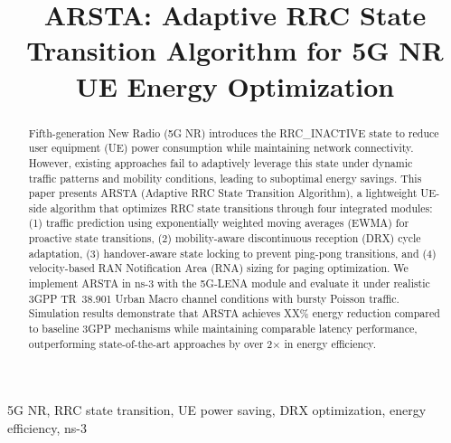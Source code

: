 \documentclass[conference]{IEEEtran}
\begin{document}
\title{ARSTA: Adaptive RRC State Transition Algorithm for 5G NR UE Energy Optimization}

\author{
}

\maketitle

\begin{abstract}
Fifth-generation New Radio (5G NR) introduces the RRC\_INACTIVE state to reduce user equipment (UE) power consumption while maintaining network connectivity. However, existing approaches fail to adaptively leverage this state under dynamic traffic patterns and mobility conditions, leading to suboptimal energy savings. This paper presents ARSTA (Adaptive RRC State Transition Algorithm), a lightweight UE-side algorithm that optimizes RRC state transitions through four integrated modules: (1) traffic prediction using exponentially weighted moving averages (EWMA) for proactive state transitions, (2) mobility-aware discontinuous reception (DRX) cycle adaptation, (3) handover-aware state locking to prevent ping-pong transitions, and (4) velocity-based RAN Notification Area (RNA) sizing for paging optimization. We implement ARSTA in ns-3 with the 5G-LENA module and evaluate it under realistic 3GPP TR~38.901 Urban Macro channel conditions with bursty Poisson traffic. Simulation results demonstrate that ARSTA achieves XX\% energy reduction compared to baseline 3GPP mechanisms while maintaining comparable latency performance, outperforming state-of-the-art approaches by over 2$\times$ in energy efficiency.
\end{abstract}

\begin{IEEEkeywords}
5G NR, RRC state transition, UE power saving, DRX optimization, energy efficiency, ns-3
\end{IEEEkeywords}
\end{document}
